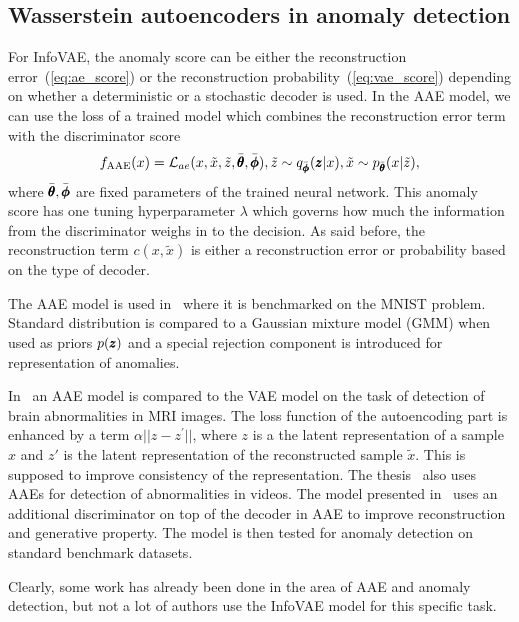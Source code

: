 \subsection{Wasserstein autoencoders in anomaly detection}

For InfoVAE, the anomaly score can be either the reconstruction error~(\ref{eq:ae_score})
or the reconstruction probability~(\ref{eq:vae_score}) depending
on whether a deterministic or a stochastic decoder is used. In the
AAE model, we can use the loss of a trained model which combines the
reconstruction error term with the discriminator score 
\begin{equation}
f_{\text{AAE}}(x)=\mathcal{L}_{ae}(x,\tilde{x},\tilde{z},\bar{\pmb{{\theta}}},\bar{\pmb{{\phi}}}),\tilde{z}\sim q_{\bar{\pmb{{\phi}}}}(\pmb{{z}}|x),\tilde{x}\sim p_{\bar{\pmb{{\theta}}}}(x|\tilde{z}),\label{eq:aae_score}
\end{equation}
where $\bar{\pmb{{\theta}}},\bar{\pmb{{\phi}}}$ are fixed parameters of the trained
neural network. This anomaly score has one tuning hyperparameter $\lambda$
which governs how much the information from the discriminator weighs
in to the decision. As said before, the reconstruction term $c(x,\tilde{x})$
is either a reconstruction error or probability based on the type
of decoder.

The AAE model is used in~\cite{leveau2017adversarial} where it
is benchmarked on the MNIST problem. Standard distribution is compared
to a Gaussian mixture model (GMM) when used as priors $p(\pmb{{z}})$ and
a special rejection component is introduced for representation of
anomalies. 

In~\cite{chen2018unsupervised} an AAE model is compared to the
VAE model on the task of detection of brain abnormalities in MRI images.
The loss function of the autoencoding part is enhanced by a term $\alpha||z-z^{\prime}||$,
where $z$ is a the latent representation of a sample $x$ and $z'$
is the latent representation of the reconstructed sample $\tilde{x}$.
This is supposed to improve consistency of the representation. The
thesis~\cite{dimokranitou2017adversarial} also uses AAEs for detection
of abnormalities in videos. The model presented in~\cite{pidhorskyi2018generative}
uses an additional discriminator on top of the decoder in AAE to improve
reconstruction and generative property. The model is then tested for
anomaly detection on standard benchmark datasets.

Clearly, some work has already been done in the area of AAE and anomaly
detection, but not a lot of authors use the InfoVAE model for this
specific task.


